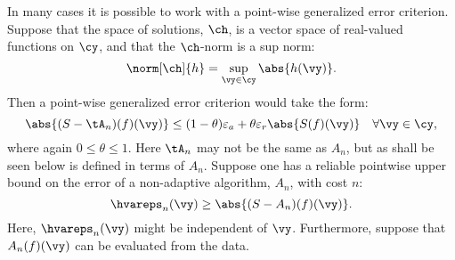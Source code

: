 \documentclass[]{elsarticle}
\theoremstyle{definition}
\theoremstyle{remark}
\begin{document}
In many cases it is possible to work with a point-wise generalized error criterion.  Suppose that the space of solutions, $\ch$, is a vector space of real-valued functions on $\cy$, and that the $\ch$-norm is a sup norm:
\begin{equation}
\norm[\ch]{h} = \sup_{\vy \in \cy} \abs{h(\vy)}.
\end{equation}
Then a point-wise generalized error criterion would take the form:
\begin{equation} \label{localgenerrcrit}
\abs{(S-\tA_n)(f)(\vy)} \le (1-\theta)\varepsilon_a + \theta \varepsilon_r \abs{S(f)(\vy)} \quad \forall \vy \in \cy,
\end{equation}
where again $0 \le \theta \le 1$.  Here $\tA_n$ may not be the same as $A_n$, but as shall be seen below is defined in terms of $A_n$.
Suppose one has a reliable pointwise upper bound on the error of a non-adaptive algorithm, $A_n$, with cost $n$:
\begin{equation} \label{hatvareps}
\hvareps_n(\vy) \ge \abs{(S-A_n)(f) (\vy)}.
\end{equation}
Here, $\hvareps_n(\vy)$ might be independent of $\vy$. Furthermore, suppose that $A_n(f)(\vy)$ can be evaluated from the data.
\end{document}
